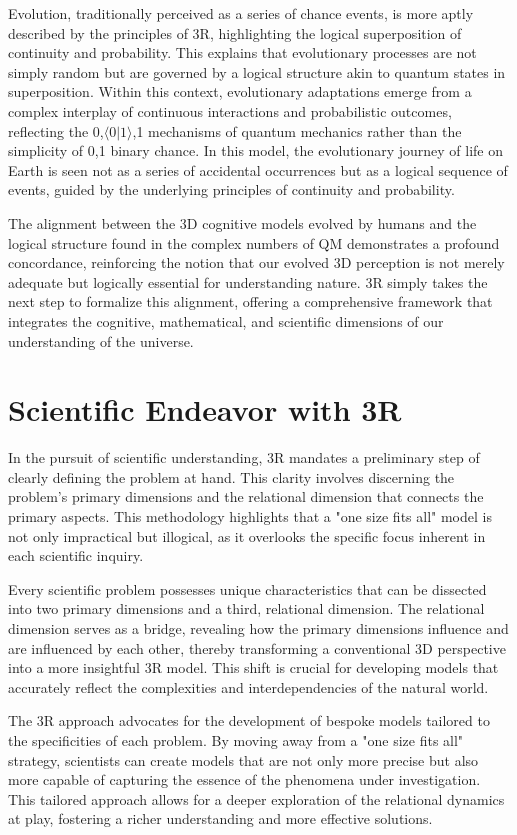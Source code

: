 \documentclass[12pt]{article}
\newcommand{\qbit}{\ensuremath{\langle 0 | 1 \rangle}}
\begin{document}
Evolution, traditionally perceived as a series of chance events, is more aptly described by the principles of 3R, highlighting the logical superposition of continuity and probability. This explains that evolutionary processes are not simply random but are governed by a logical structure akin to quantum states in superposition. Within this context, evolutionary adaptations emerge from a complex interplay of continuous interactions and probabilistic outcomes, reflecting the {0,\(\qbit\),1} mechanisms of quantum mechanics rather than the simplicity of {0,1} binary chance. In this model, the evolutionary journey of life on Earth is seen not as a series of accidental occurrences but as a logical sequence of events, guided by the underlying principles of continuity and probability.

The alignment between the 3D cognitive models evolved by humans and the logical structure found in the complex numbers of QM demonstrates a profound concordance, reinforcing the notion that our evolved 3D perception is not merely adequate but logically essential for understanding nature. 3R simply takes the next step to formalize this alignment, offering a comprehensive framework that integrates the cognitive, mathematical, and scientific dimensions of our understanding of the universe.

\section*{Scientific Endeavor with 3R}

In the pursuit of scientific understanding, 3R mandates a preliminary step of clearly defining the problem at hand. This clarity involves discerning the problem's primary dimensions and the relational dimension that connects the primary aspects. This methodology highlights that a "one size fits all" model is not only impractical but illogical, as it overlooks the specific focus inherent in each scientific inquiry.

Every scientific problem possesses unique characteristics that can be dissected into two primary dimensions and a third, relational dimension. The relational dimension serves as a bridge, revealing how the primary dimensions influence and are influenced by each other, thereby transforming a conventional 3D perspective into a more insightful 3R model. This shift is crucial for developing models that accurately reflect the complexities and interdependencies of the natural world.

The 3R approach advocates for the development of bespoke models tailored to the specificities of each problem. By moving away from a "one size fits all" strategy, scientists can create models that are not only more precise but also more capable of capturing the essence of the phenomena under investigation. This tailored approach allows for a deeper exploration of the relational dynamics at play, fostering a richer understanding and more effective solutions.
\end{document}
